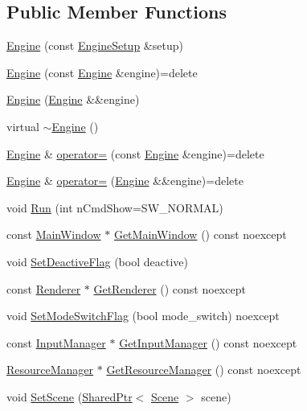 \subsection*{Public Member Functions}
\begin{DoxyCompactItemize}
\item 
\hyperlink{classmage_1_1_engine_a99770cbb017b29c284d7f8e4c7e2b84c}{Engine} (const \hyperlink{structmage_1_1_engine_setup}{Engine\+Setup} \&setup)
\item 
\hyperlink{classmage_1_1_engine_afd2f4f32b2e803f59521aafe1924f0ba}{Engine} (const \hyperlink{classmage_1_1_engine}{Engine} \&engine)=delete
\item 
\hyperlink{classmage_1_1_engine_a69ee5a698bf54da107ebaa7839812840}{Engine} (\hyperlink{classmage_1_1_engine}{Engine} \&\&engine)
\item 
virtual \hyperlink{classmage_1_1_engine_a34628556f8397d70ed018d71e343c2f5}{$\sim$\+Engine} ()
\item 
\hyperlink{classmage_1_1_engine}{Engine} \& \hyperlink{classmage_1_1_engine_a1eedff82d4c8207c61676230520648fd}{operator=} (const \hyperlink{classmage_1_1_engine}{Engine} \&engine)=delete
\item 
\hyperlink{classmage_1_1_engine}{Engine} \& \hyperlink{classmage_1_1_engine_a22607a263e0be5e179cc0e4bf13b18f7}{operator=} (\hyperlink{classmage_1_1_engine}{Engine} \&\&engine)=delete
\item 
void \hyperlink{classmage_1_1_engine_a246c82d0e55bc29e73aecbc365464ec8}{Run} (int n\+Cmd\+Show=S\+W\+\_\+\+N\+O\+R\+M\+AL)
\item 
const \hyperlink{classmage_1_1_main_window}{Main\+Window} $\ast$ \hyperlink{classmage_1_1_engine_ae12773fc604a46a3d94222ebcae2d593}{Get\+Main\+Window} () const noexcept
\item 
void \hyperlink{classmage_1_1_engine_a942bfa9892fa79bb1068d7c7ec4e6732}{Set\+Deactive\+Flag} (bool deactive)
\item 
const \hyperlink{classmage_1_1_renderer}{Renderer} $\ast$ \hyperlink{classmage_1_1_engine_a91f77d4f1914e1d63d405444a590615b}{Get\+Renderer} () const noexcept
\item 
void \hyperlink{classmage_1_1_engine_a5609c1700971f83bcf5b3259f7fea604}{Set\+Mode\+Switch\+Flag} (bool mode\+\_\+switch) noexcept
\item 
const \hyperlink{classmage_1_1_input_manager}{Input\+Manager} $\ast$ \hyperlink{classmage_1_1_engine_a9e8de859024c2b51d9b20ce498d6c07b}{Get\+Input\+Manager} () const noexcept
\item 
\hyperlink{classmage_1_1_resource_manager}{Resource\+Manager} $\ast$ \hyperlink{classmage_1_1_engine_a8b89ee555f5208a99872d724389eba0b}{Get\+Resource\+Manager} () const noexcept
\item 
void \hyperlink{classmage_1_1_engine_aec75ed67f8fb68a383fa892e50b21ea7}{Set\+Scene} (\hyperlink{namespacemage_a1e01ae66713838a7a67d30e44c67703e}{Shared\+Ptr}$<$ \hyperlink{classmage_1_1_scene}{Scene} $>$ scene)
\end{DoxyCompactItemize}
